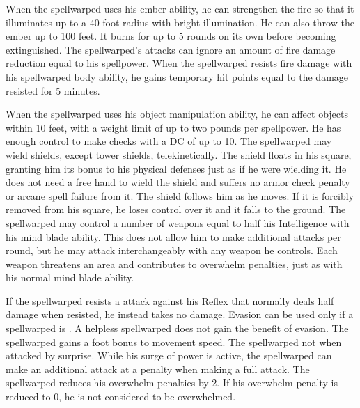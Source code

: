 When the spellwarped uses his ember ability, he can strengthen the fire so that it illuminates up to a 40 foot radius with bright illumination.
He can also throw the ember up to 100 feet.
It burns for up to 5 rounds on its own before becoming extinguished.
The spellwarped's attacks can ignore an amount of fire damage reduction equal to his spellpower.
When the spellwarped resists fire damage with his spellwarped body ability, he gains temporary hit points equal to the damage resisted for 5 minutes.

When the spellwarped uses his object manipulation ability, he can affect objects within 10 feet, with a weight limit of up to two pounds per spellpower.
He has enough control to make checks with a DC of up to 10.
The spellwarped may wield shields, except tower shields, telekinetically.
The shield floats in his square, granting him its bonus to his physical defenses just as if he were wielding it.
He does not need a free hand to wield the shield and suffers no armor check penalty or arcane spell failure from it.
The shield follows him as he moves.
If it is forcibly removed from his square, he loses control over it and it falls to the ground.
The spellwarped may control a number of weapons equal to half his Intelligence with his mind blade ability.
This does not allow him to make additional attacks per round, but he may attack interchangeably with any weapon he controls.
Each weapon threatens an area and contributes to overwhelm penalties, just as with his normal mind blade ability.

If the spellwarped resists a attack against his Reflex that normally deals half damage when resisted, he instead takes no damage.
Evasion can be used only if a spellwarped is \unencumbered.
A helpless spellwarped does not gain the benefit of evasion.
The spellwarped gains a  foot bonus to movement speed.
The spellwarped not \unaware when attacked by surprise.
While his surge of power is active, the spellwarped can make an additional attack at a  penalty when making a full attack.
The spellwarped reduces his overwhelm penalties by 2.
If his overwhelm penalty is reduced to 0, he is not considered to be overwhelmed.

